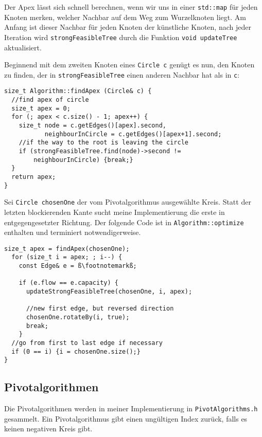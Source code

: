 Der Apex lässt sich schnell berechnen, wenn wir uns in einer \lstinline|std::map| für jeden Knoten merken, welcher Nachbar auf dem Weg zum Wurzelknoten liegt. Am Anfang ist dieser Nachbar für jeden Knoten der künstliche Knoten, nach jeder Iteration wird \lstinline|strongFeasibleTree| durch die Funktion \lstinline|void updateTree| aktualisiert.

Beginnend mit dem zweiten Knoten eines \lstinline|Circle c| genügt es nun, den Knoten zu finden, der in \lstinline|strongFeasibleTree| einen anderen Nachbar hat als in \lstinline|c|:

\begin{lstlisting}
size_t Algorithm::findApex (Circle& c) {
  //find apex of circle
  size_t apex = 0;
  for (; apex < c.size() - 1; apex++) {
    size_t node = c.getEdges()[apex].second,
           neighbourInCircle = c.getEdges()[apex+1].second;
    //if the way to the root is leaving the circle
    if (strongFeasibleTree.find(node)->second !=
        neighbourInCircle) {break;}
  }
  return apex;
}
\end{lstlisting}

Sei \lstinline|Circle chosenOne| der vom Pivotalgorithmus ausgewählte Kreis. Statt der letzten blockierenden Kante sucht meine Implementierung die erste in entgegengesetzter Richtung. Der folgende Code ist in \lstinline|Algorithm::optimize| enthalten und terminiert notwendigerweise.

\begin{lstlisting}[escapechar=ß]
  size_t apex = findApex(chosenOne);
  for (size_t i = apex; ; i--) {
    const Edge& e = ß\footnotemarkß;

    if (e.flow == e.capacity) {
      updateStrongFeasibleTree(chosenOne, i, apex);

      //new first edge, but reversed direction
      chosenOne.rotateBy(i, true);
      break;
    }
  //go from first to last edge if necessary
  if (0 == i) {i = chosenOne.size();}
}
\end{lstlisting}


\subsection{Pivotalgorithmen}
Die Pivotalgorithmen werden in meiner Implementierung in \lstinline|PivotAlgorithms.h| gesammelt. Ein Pivotalgorithmus gibt einen ungültigen Index zurück, falls es keinen negativen Kreis gibt.

